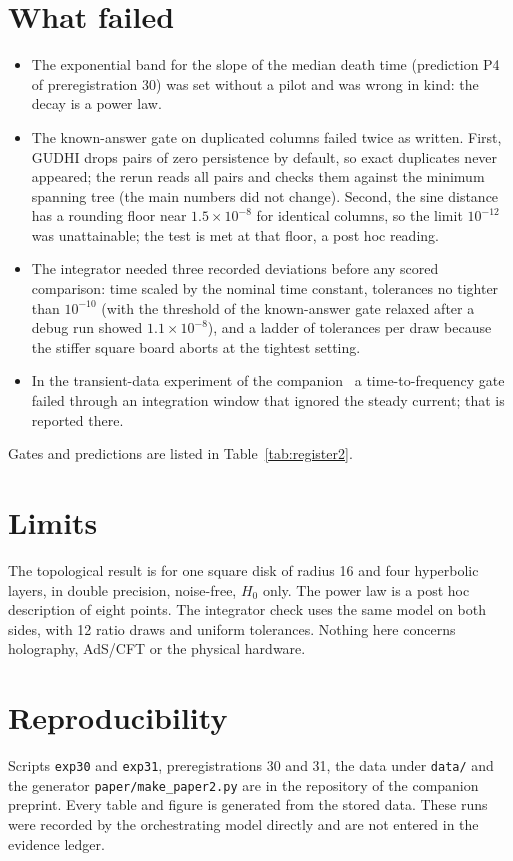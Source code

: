 \documentclass[11pt,a4paper]{article}
\begin{document}
\section{What failed}\label{sec:fail}
\begin{itemize}
\item The exponential band for the slope of the median death time (prediction P4 of preregistration 30) was set without a pilot and was wrong in kind: the decay is a power law.
\item The known-answer gate on duplicated columns failed twice as written. First, GUDHI drops pairs of zero persistence by default, so exact duplicates never appeared; the rerun reads all pairs and checks them against the minimum spanning tree (the main numbers did not change). Second, the sine distance has a rounding floor near $1.5\times10^{-8}$ for identical columns, so the limit $10^{-12}$ was unattainable; the test is met at that floor, a post hoc reading.
\item The integrator needed three recorded deviations before any scored comparison: time scaled by the nominal time constant, tolerances no tighter than $10^{-10}$ (with the threshold of the known-answer gate relaxed after a debug run showed $1.1\times10^{-8}$), and a ladder of tolerances per draw because the stiffer square board aborts at the tightest setting.
\item In the transient-data experiment of the companion~\cite{StripPaper} a time-to-frequency gate failed through an integration window that ignored the steady current; that is reported there.
\end{itemize}
Gates and predictions are listed in Table~\ref{tab:register2}.

\section{Limits}
The topological result is for one square disk of radius 16 and four hyperbolic layers, in double precision, noise-free, $H_0$ only. The power law is a post hoc description of eight points. The integrator check uses the same model on both sides, with 12 ratio draws and uniform tolerances.
Nothing here concerns holography, AdS/CFT or the physical hardware.

\section*{Reproducibility}
Scripts \texttt{exp30} and \texttt{exp31}, preregistrations 30 and 31, the data under \texttt{data/} and the generator \texttt{paper/make\_paper2.py} are in the repository of the companion preprint. Every table and figure is generated from the stored data. These runs were recorded by the orchestrating model directly and are not entered in the evidence ledger.
\end{document}
